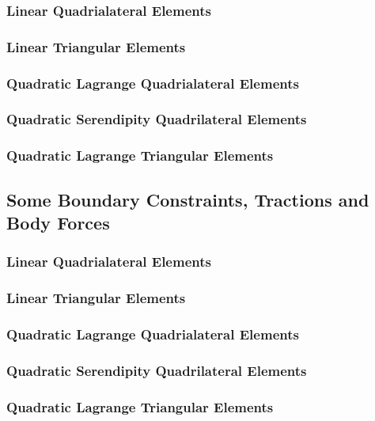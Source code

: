 \documentclass{article}
\begin{document}
    \subsubsection{Linear Quadrialateral Elements}

    \subsubsection{Linear Triangular Elements}

    \subsubsection{Quadratic Lagrange Quadrialateral Elements}

    \subsubsection{Quadratic Serendipity Quadrilateral Elements}

    \subsubsection{Quadratic Lagrange Triangular Elements}

\subsection{Some Boundary Constraints, Tractions and Body Forces}
    \subsubsection{Linear Quadrialateral Elements}

    \subsubsection{Linear Triangular Elements}

    \subsubsection{Quadratic Lagrange Quadrialateral Elements}

    \subsubsection{Quadratic Serendipity Quadrilateral Elements}

    \subsubsection{Quadratic Lagrange Triangular Elements}
\end{document}
